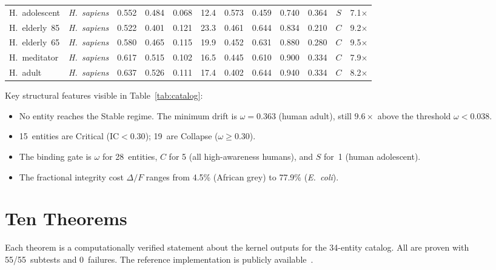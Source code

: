 \documentclass[
  aps,
  prd,
  twocolumn,
  superscriptaddress,
  nofootinbib,
  floatfix
]{revtex4-2}
\newcommand{\IC}{\mathrm{IC}}
\newcommand{\DeltaF}{\Delta\!/\!F}
\begin{document}
\begin{table}[t]
\begin{ruledtabular}
\begin{tabular}{lccccccccccc}
H.~adolescent & \textit{H.~sapiens} & 0.552 & 0.484 & 0.068
  & 12.4 & 0.573 & 0.459 & 0.740 & 0.364 & $S$ & 7.1$\times$ \\
H.~elderly~85 & \textit{H.~sapiens} & 0.522 & 0.401 & 0.121
  & 23.3 & 0.461 & 0.644 & 0.834 & 0.210 & $C$ & 9.2$\times$ \\
H.~elderly~65 & \textit{H.~sapiens} & 0.580 & 0.465 & 0.115
  & 19.9 & 0.452 & 0.631 & 0.880 & 0.280 & $C$ & 9.5$\times$ \\
H.~meditator & \textit{H.~sapiens} & 0.617 & 0.515 & 0.102
  & 16.5 & 0.445 & 0.610 & 0.900 & 0.334 & $C$ & 7.9$\times$ \\
H.~adult & \textit{H.~sapiens} & 0.637 & 0.526 & 0.111
  & 17.4 & 0.402 & 0.644 & 0.940 & 0.334 & $C$ & 8.2$\times$ \\
\end{tabular}
\end{ruledtabular}
\end{table}

Key structural features visible in Table~\ref{tab:catalog}:

\begin{itemize}
\item No entity reaches the Stable regime.  The minimum
  drift is $\omega = 0.363$ (human adult), still $9.6\times$
  above the threshold $\omega < 0.038$.
\item 15~entities are Critical ($\IC < 0.30$); 19~are
  Collapse ($\omega \ge 0.30$).
\item The binding gate is $\omega$ for 28~entities,
  $C$ for 5 (all high-awareness humans), and $S$ for~1
  (human adolescent).
\item The fractional integrity cost $\DeltaF$ ranges from
  4.5\% (African grey) to 77.9\% (\textit{E.~coli}).
\end{itemize}

\section{Ten Theorems}\label{sec:theorems}

Each theorem is a computationally verified statement about
the kernel outputs for the 34-entity catalog.  All are proven
with 55/55~subtests and 0~failures.  The reference
implementation is publicly
available~\cite{umcpmetadatarepo}.

\end{document}
